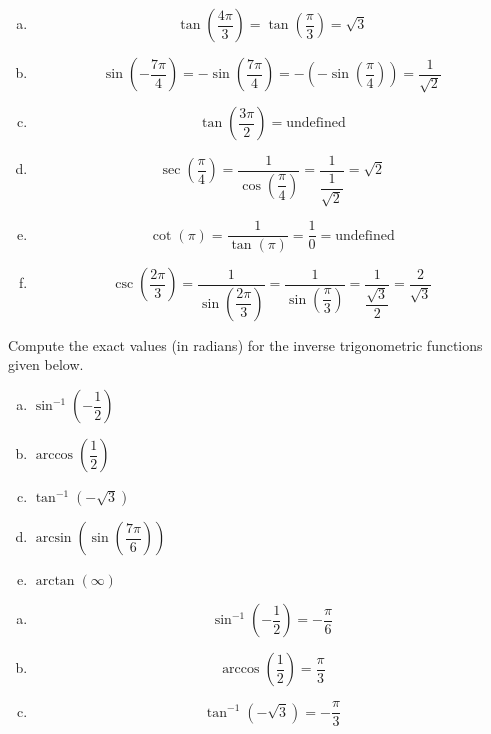 \documentclass[12pt,letterpaper]{exam}
\begin{document}
\begin{questions}
{\begin{enumerate}[(a)]
\item 
	\[
	\tan \!\left( \dfrac{4\pi}{3} \right)= \tan \!\left( \dfrac{\pi}{3} \right)= \sqrt{3}
	\]

\item 
	\[
	\sin \!\left( -\dfrac{7\pi}{4} \right)= -\sin \!\left( \dfrac{7\pi}{4} \right)= - \left( - \sin \!\left( \dfrac{\pi}{4} \right) \right)= \dfrac{1}{\sqrt{2}}
	\]

\item 
	\[
	\tan \!\left( \dfrac{3\pi}{2} \right)= \text{undefined}
	\]

\item 
	\[
	\sec \!\left( \dfrac{\pi}{4} \right)= \dfrac{1}{\cos \!\left( \dfrac{\pi}{4} \right)}= \dfrac{1}{\dfrac{1}{\sqrt{2}}}= \sqrt{2}
	\]

\item 
	\[
	\cot \left( \pi \right)= \dfrac{1}{\tan \!\left( \pi \right)}= \dfrac{1}{0}= \text{undefined}
	\]

\item 
	\[
	\csc \!\left( \dfrac{2\pi}{3} \right)= \dfrac{1}{\sin \!\left( \dfrac{2\pi}{3} \right)}= \dfrac{1}{\sin \!\left( \dfrac{\pi}{3} \right)}= \dfrac{1}{\dfrac{\sqrt{3}}{2}}= \dfrac{2}{\sqrt{3}}
	\]
\end{enumerate}
}



\newpage
\question[10] Compute the exact values (in radians) for the inverse trigonometric functions given below.
	\begin{enumerate}[(a)]
	\item $\sin^{-1} \!\!\left( -\dfrac{1}{2} \right)$
	\item $\arccos \!\left( \dfrac{1}{2} \right)$
	\item $\tan^{-1} \!\left( -\sqrt{3} \right)$
	\item $\arcsin \!\left( \sin \left( \dfrac{7\pi}{6} \right) \right)$
	\item $\arctan(\infty)$
	\end{enumerate} \pspace

{\itshape \sol 
\begin{enumerate}[(a)]
\item 
	\[
	\sin^{-1} \!\!\left( -\dfrac{1}{2} \right)= -\dfrac{\pi}{6}
	\] \pspace

\item 
	\[
	\arccos \!\left( \dfrac{1}{2} \right)= \dfrac{\pi}{3}
	\] \pspace

\item 
	\[
	\tan^{-1} \!\left( -\sqrt{3} \right)= -\dfrac{\pi}{3}
	\] \pspace


\end{enumerate}}
\end{questions}
\end{document}
